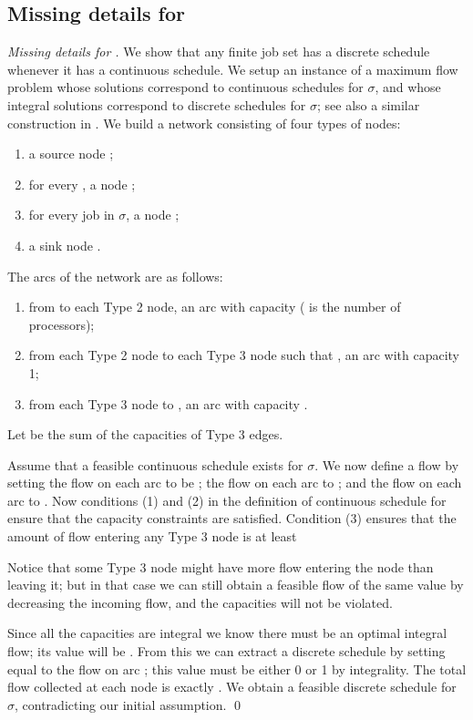 \documentclass{llncs}
\newcommand{\seq}{\ensuremath{\sigma}}
\begin{document}
\subsection{Missing details for }
\begin{proof}[Missing details for ]
We show that any finite job set  has a discrete schedule whenever it has a continuous schedule. 
We setup an instance of a maximum flow problem whose solutions correspond to continuous schedules for \seq, and whose integral solutions correspond to discrete schedules for \seq; see also a similar construction in \cite{Baruah:1996,Baruah:1990,Horn:1974}.   
We build a network  consisting of four types of nodes: 
\begin{enumerate}
\item a source node ; 
\item for every , a node ; 
\item for every job  in \seq, a node ; 
\item a sink node .  
\end{enumerate}
The arcs of the network are as follows:
\begin{enumerate}
\item from  to each Type 2 node, an arc with capacity  ( is the number of processors); 
\item from each Type 2 node  to each Type 3 node  such that , an arc with capacity 1; 
\item from each Type 3 node  to , an arc with capacity .  
\end{enumerate}
Let  be the sum of the capacities of Type 3 edges. 

Assume that a feasible continuous schedule  exists for \seq. We now define a flow by setting the flow on each arc  to be ; the flow on each arc  to ; and the flow on each arc  to . Now conditions (1) and (2) in the definition of continuous schedule for  ensure that the capacity constraints are satisfied. Condition (3) ensures that the amount of flow entering any Type 3 node  is at least 

Notice that some Type 3 node might have more flow entering the node than leaving it; but in that case we can still obtain a feasible flow of the same value by decreasing the incoming flow, and the capacities will not be violated.   

Since all the capacities are integral we know there must be an optimal integral flow; its value will be . From this we can extract a discrete schedule by setting  equal to the flow on arc ; this value must be either 0 or 1 by integrality. The total flow collected at each node  is exactly . We obtain a feasible discrete schedule for \seq, contradicting our initial assumption.  
\qed
\end{proof}
\end{document}
